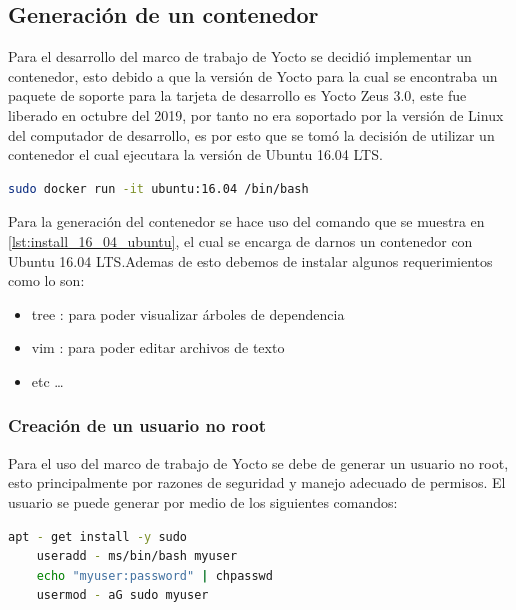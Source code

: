 \subsection{Generación de un contenedor}

Para el desarrollo del marco de trabajo de Yocto se decidió implementar un contenedor, esto debido a que la versión de Yocto para la cual se encontraba un paquete de soporte para la tarjeta de desarrollo es Yocto Zeus 3.0, este fue liberado en octubre del 2019, por tanto no era soportado por la versión de Linux del computador de desarrollo, es por esto que se tomó la decisión de utilizar un contenedor el cual ejecutara la versión de Ubuntu 16.04 LTS. 

\begin{lstlisting}[language=bash, caption={Comando para la instalacion de Ubuntu 16.04}, label=lst:install_16_04_ubuntu]
    sudo docker run -it ubuntu:16.04 /bin/bash
\end{lstlisting}

Para la generación del contenedor se hace uso del comando que se muestra en \ref{lst:install_16_04_ubuntu}, el cual se encarga de darnos un contenedor con Ubuntu 16.04 LTS.Ademas de esto debemos de instalar algunos requerimientos como lo son:

\begin{itemize}
    \item tree : para poder visualizar árboles de dependencia
    \item vim : para poder editar archivos de texto
    \item etc \dots
\end{itemize}

\subsubsection{Creación de un usuario no root}

Para el uso del marco de trabajo de Yocto se debe de generar un usuario no root, esto principalmente por razones de seguridad y manejo adecuado de permisos. El usuario se puede generar por medio de los siguientes comandos:

\begin{lstlisting}[language=bash, caption={Generacion de usuario no root}, label=lst:no_root_user]
    apt - get install -y sudo
    useradd - ms/bin/bash myuser
    echo "myuser:password" | chpasswd
    usermod - aG sudo myuser
\end{lstlisting}

